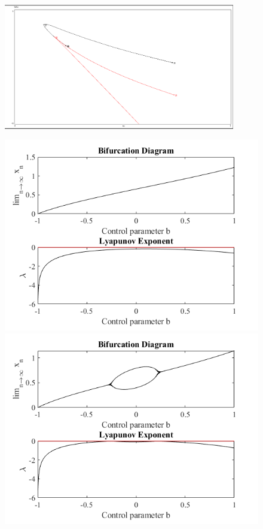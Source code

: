 \documentclass[a4paper,12pt,notitlepage]{article}
\begin{document}
\begin{figure}[h]
        \centering
        \includegraphics[width=0.9\textwidth]{2bif.png} 
\end{figure}

\begin{figure}[h]
    \centering
        \centering
        \includegraphics[width=\textwidth]{a=1.png} 

        \centering
        \includegraphics[width=\textwidth]{a=1_5.png} 
\end{figure}
\end{document}

